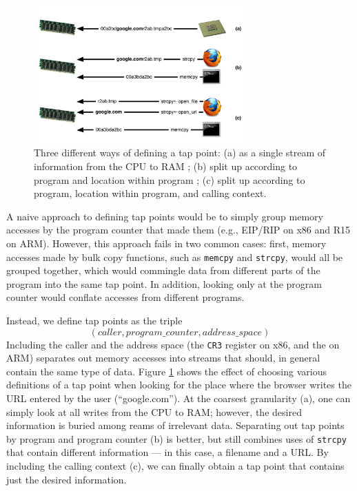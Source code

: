 \begin{figure}[t]
\begin{center}
\includegraphics[width=3.2in]{tappoint.pdf}
\end{center}
\caption{Three different ways of defining a tap point: (a) as a single
stream of information from the CPU to RAM ; (b) split up according to
program and location within program ; (c) split up according to program,
location within program, and calling context.}
\label{fig:tappoint}
\end{figure}

A naive approach to defining tap points would be to simply group memory
accesses by the program counter that made them (e.g., EIP/RIP on x86 and
R15 on ARM). However, this approach fails in two common cases: first,
memory accesses made by bulk copy functions, such as \texttt{memcpy} and
\texttt{strcpy}, would all be grouped together, which would commingle
data from different parts of the program into the same tap point. In
addition, looking only at the program counter would conflate accesses
from different programs.

Instead, we define tap points as the triple \[ (caller, program\_counter,
address\_space) \] Including the caller and the address space (the
\texttt{CR3} register on x86, and the  on ARM) separates
out memory accesses into streams that should, in general contain the
same type of data. Figure \ref{fig:tappoint} shows the effect of
choosing various definitions of a tap point when looking for the place
where the browser writes the URL entered by the user (``google.com'').
At the coarsest granularity (a), one can simply look at all writes from
the CPU to RAM; however, the desired information is buried among reams
of irrelevant data. Separating out tap points by program and program
counter (b) is better, but still combines uses of \texttt{strcpy} that
contain different information --- in this case, a filename and a URL. By
including the calling context (c), we can finally obtain a tap point
that contains just the desired information.

